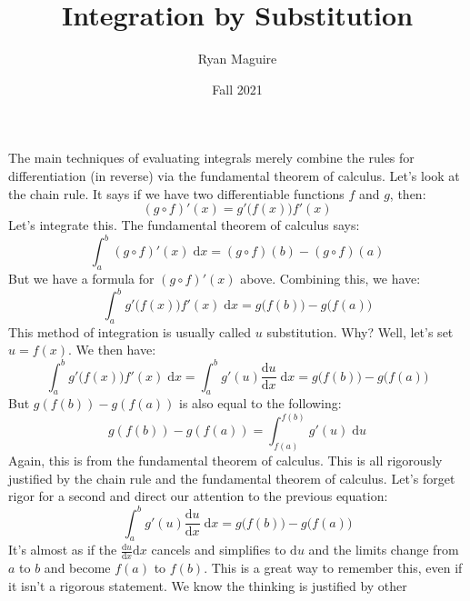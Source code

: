 \documentclass{article}
\title{Integration by Substitution}
\author{Ryan Maguire}
\date{Fall 2021}
\theoremstyle{normal}
\theoremstyle{plain}
\begin{document}
    \maketitle
    The main techniques of evaluating integrals merely combine the rules for
    differentiation (in reverse) via the fundamental theorem of calculus. Let's
    look at the chain rule. It says if we have two differentiable functions
    $f$ and $g$, then:
    \begin{equation}
        (g\circ{f})'(x)=g'\big(f(x)\big)f'(x)
    \end{equation}
    Let's integrate this. The fundamental theorem of calculus says:
    \begin{equation}
        \int_{a}^{b}(g\circ{f})'(x)\;\textrm{d}x
            =(g\circ{f})(b)-(g\circ{f})(a)
    \end{equation}
    But we have a formula for $(g\circ{f})'(x)$ above. Combining this, we have:
    \begin{equation}
        \int_{a}^{b}g'\big(f(x)\big)f'(x)\;\textrm{d}x
            =g\big(f(b)\big)-g\big(f(a)\big)
    \end{equation}
    This method of integration is usually called $u$ substitution. Why?
    Well, let's set $u=f(x)$. We then have:
    \begin{equation}
        \int_{a}^{b}g'\big(f(x)\big)f'(x)\;\textrm{d}x
            =\int_{a}^{b}g'(u)\frac{\textrm{d}u}{\textrm{d}x}\;\textrm{d}x
            =g\big(f(b)\big)-g\big(f(a)\big)
    \end{equation}
    But $g(f(b))-g(f(a))$ is also equal to the following:
    \begin{equation}
        g(f(b))-g(f(a))=\int_{f(a)}^{f(b)}g'(u)\;\textrm{d}u
    \end{equation}
    Again, this is from the fundamental theorem of calculus. This is all
    rigorously justified by the chain rule and the fundamental theorem of
    calculus. Let's forget rigor for a second and direct our attention to the
    previous equation:
    \begin{equation}
        \int_{a}^{b}g'(u)\frac{\textrm{d}u}{\textrm{d}x}\;\textrm{d}x
            =g\big(f(b)\big)-g\big(f(a)\big)
    \end{equation}
    It's almost as if the $\frac{\textrm{d}u}{\textrm{d}x}\textrm{d}x$ cancels
    and simplifies to $\textrm{d}u$ and the limits change from $a$ to $b$ and
    become $f(a)$ to $f(b)$. This is a great way to remember this, even if it
    isn't a rigorous statement. We know the thinking is justified by other
\end{document}
